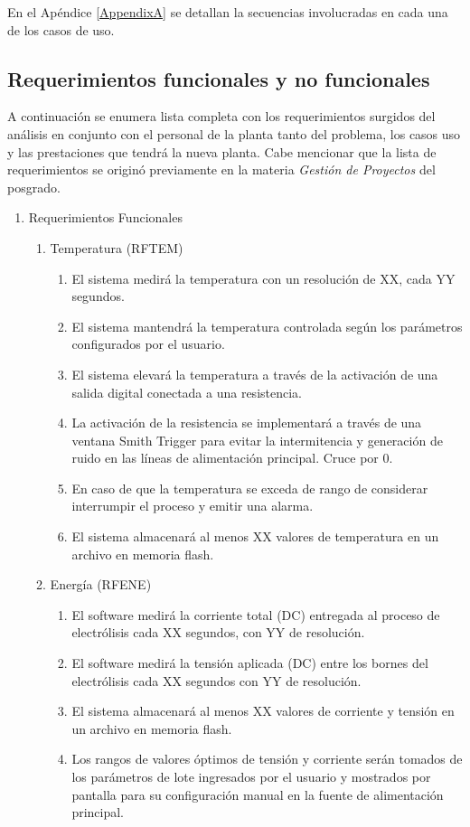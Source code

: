 En el Apéndice \ref{AppendixA} se detallan la secuencias involucradas en cada una de los casos de uso.

\subsection{ Requerimientos funcionales y no funcionales }
\label{subsec:Requerimientos}

A continuación se enumera lista completa con los requerimientos surgidos del análisis en conjunto con el personal de la planta tanto del problema, los casos uso y las prestaciones que tendrá la nueva planta. 
Cabe mencionar que la lista de requerimientos se originó previamente en la materia \emph{Gestión de Proyectos} del posgrado.

\begin{enumerate}
\item Requerimientos Funcionales
\begin{enumerate}

\item Temperatura (RFTEM)
\begin{enumerate}
\item El sistema medirá la temperatura con un resolución de XX, cada YY segundos.
\item El sistema mantendrá la temperatura controlada según los parámetros configurados por el usuario.
\item El sistema elevará la temperatura a través de la activación de una salida digital conectada a una resistencia.
\item La activación de la resistencia se implementará a través de una ventana Smith Trigger para evitar la intermitencia y generación de ruido en las líneas de alimentación principal. Cruce por 0.
\item En caso de que la temperatura se exceda de rango de considerar interrumpir el proceso y emitir una alarma.
\item El sistema almacenará al menos XX valores de temperatura en un archivo en memoria flash.
\end{enumerate}

\item Energía (RFENE)
\begin{enumerate}
\item El software medirá la corriente total (DC) entregada al proceso de electrólisis cada XX segundos, con YY de resolución.
\item El software medirá la tensión aplicada (DC) entre los bornes del electrólisis cada XX segundos con YY de resolución.
\item El sistema almacenará al menos XX valores de corriente y tensión en un archivo en memoria flash.
\item Los rangos de valores óptimos de tensión y corriente serán tomados de los parámetros de lote ingresados por el usuario y mostrados por pantalla para su configuración manual en la fuente de alimentación principal.
\end{enumerate}


\end{enumerate}
\end{enumerate}
